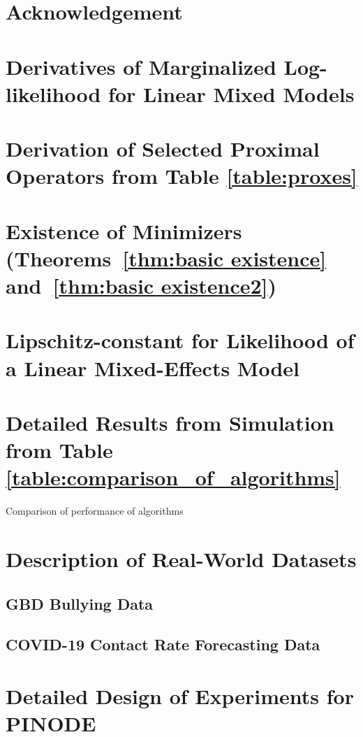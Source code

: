 \documentclass[12pt,a4paper]{book}
\numberwithin{equation}{section} %
\numberwithin{figure}{section} %
\numberwithin{table}{section} %
\begin{document}
\section{Acknowledgement}


\section{Derivatives of Marginalized Log-likelihood for Linear Mixed Models}
\label{appendix:derivatives_of_lmm}


\section{Derivation of Selected Proximal Operators from Table \ref{table:proxes}}
\label{appendix:proxes}


\section{Existence of Minimizers (Theorems~\ref{thm:basic existence} and~\ref{thm:basic existence2})}
\label{adx:basic existence}


\section{Lipschitz-constant for Likelihood of a Linear Mixed-Effects Model}
\label{appendix:lipschitz_constant}


\section{Detailed Results from Simulation from Table \ref{table:comparison_of_algorithms}}
\label{appendix:detailed_comparison}
\begin{table}[t]
    \centering
    \resizebox{\columnwidth}{!}{}
    \caption{Comparison of performance of algorithms}
    \label{table:detailed_comparison_of_algorithms}
\end{table}

\section{Description of Real-World Datasets}
\subsection{GBD Bullying Data}


\subsection{COVID-19 Contact Rate Forecasting Data}



\section{Detailed Design of Experiments for PINODE}

\end{document}
